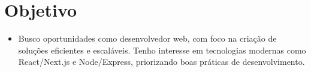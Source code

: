 \section{Objetivo}
    \begin{itemize}[leftmargin=0.15in, label={}]
        \item{Busco oportunidades como desenvolvedor web, com foco na criação de soluções eficientes e escaláveis. Tenho interesse em tecnologias modernas como React/Next.js e Node/Express, priorizando boas práticas de desenvolvimento.}
    \end{itemize}